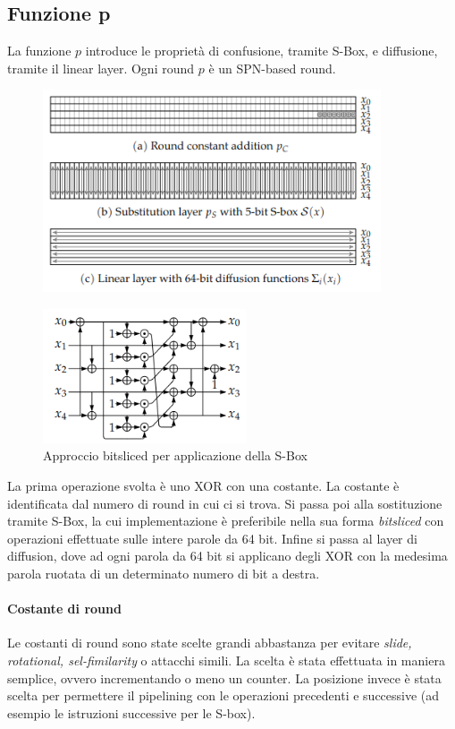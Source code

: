 \subsection{Funzione p}
La funzione $p$ introduce le proprietà di confusione, tramite S-Box, e diffusione, tramite il linear layer. Ogni round $p$ è un SPN-based round.  
\begin{figure}[h!]
    \centering
    \includegraphics[width=10cm]{images/p.png}
\end{figure}
\begin{figure}[h!]
    \centering
    \includegraphics[width=6cm]{images/sbox.png}
    \caption[short]{Approccio bitsliced per applicazione della S-Box}
\end{figure}
\newline
La prima operazione svolta è uno XOR con una costante. La costante è identificata dal numero di round in cui ci si trova. Si passa poi alla sostituzione tramite S-Box, la cui implementazione è preferibile nella sua forma \textsl{bitsliced} con operazioni effettuate sulle intere parole da 64 bit. Infine si passa al layer di diffusion, dove ad ogni parola da 64 bit si applicano degli XOR con la medesima parola ruotata di un determinato numero di bit a destra. 
\paragraph*{Costante di round}
Le costanti di round sono state scelte grandi abbastanza per evitare \textsl{slide, rotational, sel-fimilarity} o attacchi simili. La scelta è stata effettuata in maniera semplice, ovvero incrementando o meno un counter. La posizione invece è stata scelta per permettere il pipelining con le operazioni precedenti e successive (ad esempio le istruzioni successive per le S-box). 
